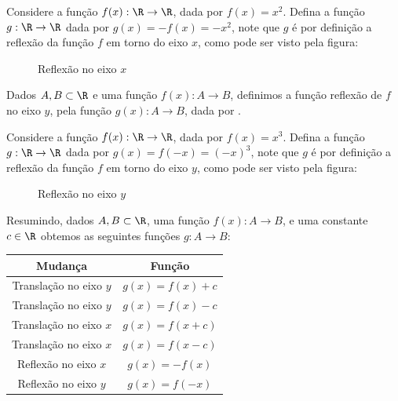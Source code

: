  \begin{exem}
  Considere a função $f(x): \R \to \R$, dada por $f(x)= x^2$. Defina a função $g: \R \to \R$ dada por $g(x)=-f(x)= -x^2$, note que $g$ é por definição a reflexão da função $f$ em torno do eixo $x$, como pode ser visto pela figura:

\begin{figure}[H]
   \centering
   \caption{Reflexão no eixo $x$}
  \end{figure}

 \end{exem}


 Dados $A, B \subset \R$ e uma função $f(x): A \to B$, definimos a função reflexão de $f$ no eixo $y$, pela função $g(x): A \to B$, dada por .

 \begin{exem}
  Considere a função $f(x): \R \to \R$, dada por $f(x)= x^3$. Defina a função $g: \R \to \R$ dada por $g(x)=f(-x)= (-x)^3$, note que $g$ é por definição a reflexão da função $f$ em torno do eixo $y$, como pode ser visto pela figura:

\begin{figure}[H]
   \centering
   \caption{Reflexão no eixo $y$}
  \end{figure}

 \end{exem}

 Resumindo, dados $A, B \subset \R$, uma função $f(x): A \to B$, e uma constante $c \in \R$ obtemos as seguintes funções $g: A \to B$:
  \begin{table}[H]
 \centering
 \begin{tabular}{|c|c|} \hline
 \rowcolor{cinza}
  Mudança & Função \\\hline
  Translação no eixo $y$ & $g(x)= f(x)+ c$ \\\hline
  Translação no eixo $y$ & $g(x)= f(x)- c$ \\\hline
  Translação no eixo $x$ & $g(x)= f(x+ c)$ \\\hline
  Translação no eixo $x$ & $g(x)= f(x- c)$ \\\hline
  Reflexão no eixo $x$ & $g(x)= -f(x)$ \\\hline
  Reflexão no eixo $y$ & $g(x)= f(-x)$ \\\hline
 \end{tabular}
\end{table}

